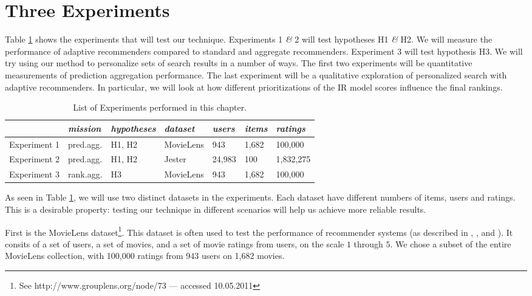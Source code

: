 \section{Three Experiments}

Table \ref{table:experiments} shows the experiments that will test our technique.
Experiments 1 \emph{\&} 2 will test hypotheses H1 \emph{\&} H2.
We will measure the performance of adaptive recommenders compared to standard and aggregate recommenders.
Experiment 3 will test hypothesis H3.
We will try using our method to personalize sets of search results in a number of ways.
The first two experiments will be quantitative measurements of prediction aggregation performance.
The last experiment will be a qualitative exploration of personalized search with adaptive recommenders.
In particular, we will look at how different prioritizations of the IR model scores influence the final rankings.

\vspace{1em}
\begin{table}[h]
  \begin{tabular*}{\textwidth}{ l l l l l l l }
    \toprule
      ~ & 
      \emph{mission} &
      \emph{hypotheses} &
      \emph{dataset} &
      \emph{users} &
      \emph{items} &
      \emph{ratings} \\
    \midrule
    
    Experiment 1 &
    pred.agg. &
    H1, H2 &
    MovieLens &
    943 &
    1,682 &
    100,000 \\
    
    Experiment 2 &
    pred.agg. &
    H1, H2 &
    Jester &
    24,983 &
    100 &
    1,832,275 \\

    Experiment 3 &
    rank.agg. &
    H3 &
    MovieLens &
    943 &
    1,682 &
    100,000 \\

    
    \bottomrule 
  \end{tabular*}
  \caption[List of Experiments]{List of Experiments performed in this chapter.}
  \label{table:experiments}
\end{table}

\noindent
As seen in Table \ref{table:experiments}, 
we will use two distinct datasets in the experiments.
Each dataset have different numbers of items, users and ratings.
This is a desirable property:
testing our technique in different scenarios
will help us achieve more reliable results.

First is the MovieLens dataset\footnote{
See http://www.grouplens.org/node/73 --- accessed 10.05.2011}.
This dataset is often used to test the performance of recommender systems
(as described in 
\citet[p9]{Alshamri2008}, \citet[p4]{Lemire2005}, \citet[p1]{Adomavicius2005} and \citet[p2]{Herlocker2004}).
It consits of a set of users, a set of movies, and a set of movie ratings from users,
on the scale $1$ through $5$.
We chose a subset of the entire MovieLens collection, with 100,000 ratings from 943 users on 1,682 movies.

